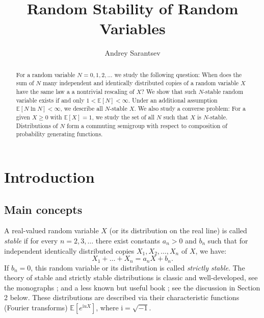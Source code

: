\documentclass[12pt]{amsart}
\theoremstyle{remark}
\theoremstyle{definition}
\begin{document}
\title[Random Stability of Random Variables]{Random Stability of Random Variables}

\author{Andrey Sarantsev}
\address{University of Nevada, Reno, Department of Mathematics and Statistics}


\begin{abstract}
For a random variable $N = 0, 1, 2, \ldots$ we study the following question: When does   the sum of $N$ many independent and identically distributed copies of a random variable $X$ have the same law a a nontrivial rescaling of $X$? We show that such $N$-stable random variable exists if and only $1 < \mathbb E[N] < \infty$. Under an additional assumption $\mathbb E[N\ln N] < \infty$, we describe all $N$-stable $X$. We also study a converse problem: For a given $X \ge 0$ with $\mathbb E[X] = 1$, we study the set of all $N$ such that $X$ is $N$-stable. Distributions of $N$ form a commuting semigroup with respect to composition of probability generating functions. 
\end{abstract}

\maketitle

\thispagestyle{empty}

\section{Introduction}

\subsection{Main concepts} 
A real-valued random variable $X$ (or its distribution on the real line) is called {\it stable} if for every $n = 2, 3, \ldots$ there exist constants $a_n > 0$ and $b_n$ such that for independent identically distributed copies $X_1, X_2, \ldots, X_n$ of $X$, we have: 
$$
X_1 + \ldots + X_n = a_nX + b_n.
$$
If $b_n = 0$, this random variable or its distribution is called {\it strictly stable}. The theory of stable and strictly stable distributions is classic and well-developed, see the monographs \cite{STbook, SteutelBook}; and a less known but useful book \cite[Chapter 2]{KlebanovBook}; see the discussion in Section 2 below. These distributions are described via their characteristic functions (Fourier transforms) $\mathbb E[e^{\mathrm{i}uX}]$, where $\mathrm{i} = \sqrt{-1}$. 
\end{document}
